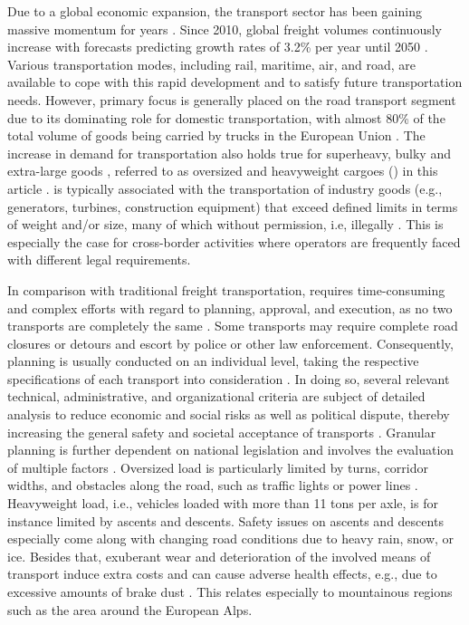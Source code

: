 
Due to a global economic expansion, the transport sector has been gaining massive momentum for years \cite{gungor2018detect}.
Since 2010, global freight volumes continuously increase with forecasts predicting growth rates of 3.2\% per year until 2050 \cite{figura2020preferences, InternationalTransportForum}.
Various transportation modes, including rail, maritime, air, and road, are available to cope with this rapid development and to satisfy future transportation needs.
However, primary focus is generally placed on the road transport segment due to its dominating role for domestic transportation, with almost 80\% of the total volume of goods being carried by trucks in the European Union \cite{Eurostat}.
The increase in demand for transportation also holds true for superheavy, bulky and extra-large goods \cite{gavrilova2021analysis}, referred to as oversized and heavyweight cargoes (\ohc) in this article \cite{Luo.2021}.
\ohc is typically associated with the transportation of industry goods (e.g., generators, turbines, construction equipment) that exceed defined limits in terms of weight and/or size, many of which without permission, i.e, illegally \cite{fiorillo2016minimizing}. This is especially the case for cross-border activities where operators are frequently faced with different legal requirements.
\par In comparison with traditional freight transportation, \ohc requires time-consuming and complex efforts with regard to planning, approval, and execution, as no two \ohc transports are completely the same \cite{Wolnowska.2019}.
Some \ohc transports may require complete road closures or detours and escort by police or other law enforcement.
Consequently, planning is usually conducted on an individual level, taking the respective specifications of each \ohc transport into consideration \cite{Bazaras.2013}.
In doing so, several relevant technical, administrative, and organizational criteria are subject of detailed analysis to reduce economic and social risks as well as political dispute, thereby increasing the general safety and societal acceptance of \ohc transports \cite{Palsaitis.2012}.
Granular planning is further dependent on national legislation and involves the evaluation of multiple factors \cite{zhu2014vehicle}. Oversized load is particularly limited by turns, corridor widths, and obstacles along the road, such as traffic lights or power lines \cite{PETRASKA.2018, arentze2012context}. Heavyweight load, i.e., vehicles loaded with more than 11 tons per axle, is for instance limited by ascents and descents. Safety issues on ascents and descents especially come along with changing road conditions due to heavy rain, snow, or ice. Besides that, exuberant wear and deterioration of the involved means of transport induce extra costs and can cause adverse health effects, e.g., due to excessive amounts of brake dust \cite{Gerlofs2019}. This relates especially to mountainous regions such as the area around the European Alps.
